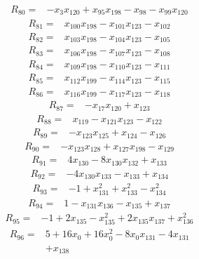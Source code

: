 \begin{align*} R_{80}={}&-x_{3}x_{120} +x_{95}x_{198} -x_{98} -x_{99}x_{120}
\end{align*}
\begin{align*} R_{81}={}&x_{100}x_{198} -x_{101}x_{123} -x_{102}
\end{align*}
\begin{align*} R_{82}={}&x_{103}x_{198} -x_{104}x_{123} -x_{105}
\end{align*}
\begin{align*} R_{83}={}&x_{106}x_{198} -x_{107}x_{123} -x_{108}
\end{align*}
\begin{align*} R_{84}={}&x_{109}x_{198} -x_{110}x_{123} -x_{111}
\end{align*}
\begin{align*} R_{85}={}&x_{112}x_{199} -x_{114}x_{123} -x_{115}
\end{align*}
\begin{align*} R_{86}={}&x_{116}x_{199} -x_{117}x_{123} -x_{118}
\end{align*}
\begin{align*} R_{87}={}&-x_{17}x_{120} +x_{123}
\end{align*}
\begin{align*} R_{88}={}&x_{119} -x_{121}x_{123} -x_{122}
\end{align*}
\begin{align*} R_{89}={}&-x_{123}x_{125} +x_{124} -x_{126}
\end{align*}
\begin{align*} R_{90}={}&-x_{123}x_{128} +x_{127}x_{198} -x_{129}
\end{align*}
\begin{align*} R_{91}={}&4 x_{130} -8 x_{130}x_{132} +x_{133}
\end{align*}
\begin{align*} R_{92}={}&-4 x_{130}x_{133} -x_{133} +x_{134}
\end{align*}
\begin{align*} R_{93}={}&-1 +x_{131}^{2} +x_{133}^{2} -x_{134}^{2}
\end{align*}
\begin{align*} R_{94}={}&1 -x_{131}x_{136} -x_{135} +x_{137}
\end{align*}
\begin{align*} R_{95}={}&-1 +2 x_{135} -x_{135}^{2} +2 x_{135}x_{137} +x_{136}^{2}
\end{align*}
\begin{align*} R_{96}={}&5 +16 x_{0} +16 x_{0}^{2} -8 x_{0}x_{131} -4 x_{131}
\\ &+x_{138}
\end{align*}

